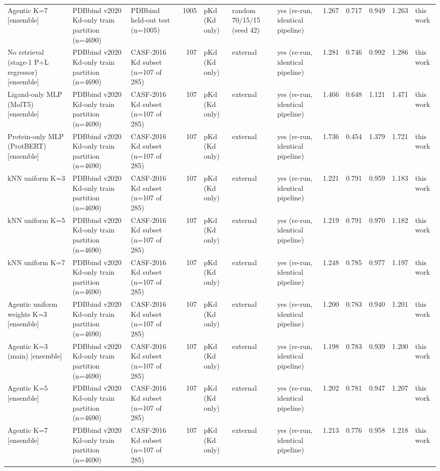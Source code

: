 \begin{tabular}{lllrlllrrrrl}
Agentic K=7 [ensemble] & PDBbind v2020 Kd-only train partition (n=4690) & PDBbind held-out test (n=1005) & 1005 & pKd (Kd only) & random 70/15/15 (seed 42) & yes (re-run, identical pipeline) & 1.267 & 0.717 & 0.949 & 1.263 & this work \\
No retrieval (stage-1 P+L regressor) [ensemble] & PDBbind v2020 Kd-only train partition (n=4690) & CASF-2016 Kd subset (n=107 of 285) & 107 & pKd (Kd only) & external & yes (re-run, identical pipeline) & 1.281 & 0.746 & 0.992 & 1.286 & this work \\
Ligand-only MLP (MolT5) [ensemble] & PDBbind v2020 Kd-only train partition (n=4690) & CASF-2016 Kd subset (n=107 of 285) & 107 & pKd (Kd only) & external & yes (re-run, identical pipeline) & 1.466 & 0.648 & 1.121 & 1.471 & this work \\
Protein-only MLP (ProtBERT) [ensemble] & PDBbind v2020 Kd-only train partition (n=4690) & CASF-2016 Kd subset (n=107 of 285) & 107 & pKd (Kd only) & external & yes (re-run, identical pipeline) & 1.736 & 0.454 & 1.379 & 1.721 & this work \\
kNN uniform K=3 & PDBbind v2020 Kd-only train partition (n=4690) & CASF-2016 Kd subset (n=107 of 285) & 107 & pKd (Kd only) & external & yes (re-run, identical pipeline) & 1.221 & 0.791 & 0.959 & 1.183 & this work \\
kNN uniform K=5 & PDBbind v2020 Kd-only train partition (n=4690) & CASF-2016 Kd subset (n=107 of 285) & 107 & pKd (Kd only) & external & yes (re-run, identical pipeline) & 1.219 & 0.791 & 0.970 & 1.182 & this work \\
kNN uniform K=7 & PDBbind v2020 Kd-only train partition (n=4690) & CASF-2016 Kd subset (n=107 of 285) & 107 & pKd (Kd only) & external & yes (re-run, identical pipeline) & 1.248 & 0.785 & 0.977 & 1.197 & this work \\
Agentic uniform weights K=3 [ensemble] & PDBbind v2020 Kd-only train partition (n=4690) & CASF-2016 Kd subset (n=107 of 285) & 107 & pKd (Kd only) & external & yes (re-run, identical pipeline) & 1.200 & 0.783 & 0.940 & 1.201 & this work \\
Agentic K=3 (main) [ensemble] & PDBbind v2020 Kd-only train partition (n=4690) & CASF-2016 Kd subset (n=107 of 285) & 107 & pKd (Kd only) & external & yes (re-run, identical pipeline) & 1.198 & 0.783 & 0.939 & 1.200 & this work \\
Agentic K=5 [ensemble] & PDBbind v2020 Kd-only train partition (n=4690) & CASF-2016 Kd subset (n=107 of 285) & 107 & pKd (Kd only) & external & yes (re-run, identical pipeline) & 1.202 & 0.781 & 0.947 & 1.207 & this work \\
Agentic K=7 [ensemble] & PDBbind v2020 Kd-only train partition (n=4690) & CASF-2016 Kd subset (n=107 of 285) & 107 & pKd (Kd only) & external & yes (re-run, identical pipeline) & 1.213 & 0.776 & 0.958 & 1.218 & this work \\
\bottomrule
\end{tabular}

